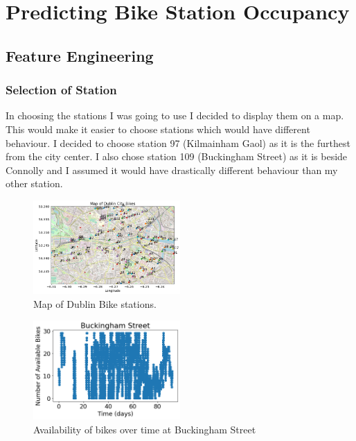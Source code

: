 \maketitle


\section{Predicting Bike Station Occupancy}
\subsection{Feature Engineering}
\subsubsection{Selection of Station}
In choosing the stations I was going to use I decided to display them on a map.
This would make it easier to choose stations which would have different behaviour.
I decided to choose station 97 (Kilmainham Gaol) as it is the furthest from the city center.
I also chose station 109 (Buckingham Street) as it is beside Connolly and I assumed it would have drastically different behaviour than my other station.

\begin{figure}[H]
\centering
\includegraphics[width=0.5\textwidth]{images/map.png}
\caption{Map of Dublin Bike stations.}
\end{figure}

\begin{figure}[H]
    \centering
    \includegraphics[width=0.5\textwidth]{images/buckingham data.png}
    \caption{Availability of bikes over time at Buckingham Street}
    \end{figure}


